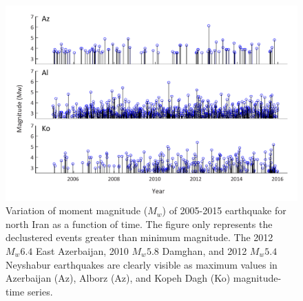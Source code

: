 \begin{figure} [ht]
\centering
\includegraphics[scale=0.8]{figures/pdf/Figure05.pdf} 
\caption{Variation of moment magnitude ($M_w$) of 2005-2015 earthquake for north Iran as a function of time. The figure only represents the declustered events greater than minimum magnitude. The 2012 $M_w 6.4$ East Azerbaijan, 2010 $M_w 5.8$ Damghan, and 2012 $M_w 5.4$ Neyshabur earthquakes are clearly visible as maximum values in Azerbaijan (Az),  Alborz (Az), and Kopeh Dagh (Ko) magnitude-time series.}
\label{fig:mag-time}
\end{figure} 

 


